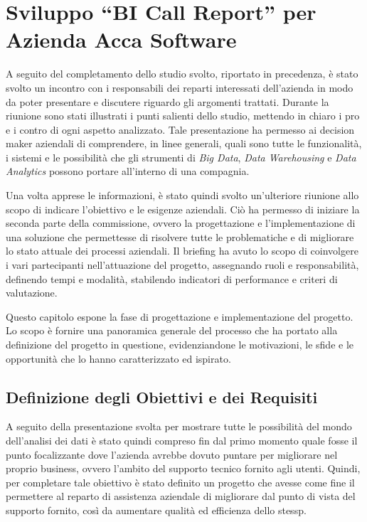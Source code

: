\chapter{Sviluppo ``BI Call Report'' per Azienda Acca Software}
\label{ch:Project}

A seguito del completamento dello studio svolto, riportato in precedenza, è stato svolto un incontro con i responsabili dei reparti interessati dell'azienda in modo da poter presentare e discutere riguardo gli argomenti trattati. Durante la riunione sono stati illustrati i punti salienti dello studio, mettendo in chiaro i pro e i contro di ogni aspetto analizzato. Tale presentazione ha permesso ai decision maker aziendali di comprendere, in linee generali, quali sono tutte le funzionalità, i sistemi e le possibilità che gli strumenti di \textit{Big Data}, \textit{Data Warehousing} e \textit{Data Analytics} possono portare all'interno di una compagnia. 

Una volta apprese le informazioni, è stato quindi svolto un'ulteriore riunione allo scopo di indicare l'obiettivo e le esigenze aziendali. Ciò ha permesso di iniziare la seconda parte della commissione, ovvero la progettazione e l'implementazione di una soluzione che permettesse di risolvere tutte le problematiche e di migliorare lo stato attuale dei processi aziendali. Il briefing ha avuto lo scopo di coinvolgere i vari partecipanti nell'attuazione del progetto, assegnando ruoli e responsabilità, definendo tempi e modalità, stabilendo indicatori di performance e criteri di valutazione.

Questo capitolo espone la fase di progettazione e implementazione del progetto. Lo scopo è fornire una panoramica generale del processo che ha portato alla definizione del progetto in questione, evidenziandone le motivazioni, le sfide e le opportunità che lo hanno caratterizzato ed ispirato.

\section{Definizione degli Obiettivi e dei Requisiti}

A seguito della presentazione svolta per mostrare tutte le possibilità del mondo dell'analisi dei dati è stato quindi compreso fin dal primo momento quale fosse il punto focalizzante dove l'azienda avrebbe dovuto puntare per migliorare nel proprio business, ovvero l'ambito del supporto tecnico fornito agli utenti. Quindi, per completare tale obiettivo è stato definito un progetto che avesse come fine il permettere al reparto di assistenza aziendale di migliorare dal punto di vista del supporto fornito, così da aumentare qualità ed efficienza dello stessp.

